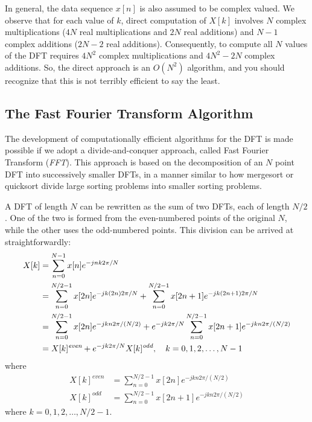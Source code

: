 In general, the data sequence $x[n]$ is also assumed to be complex
valued. We observe that for each value of $k$, direct computation of
$X[k]$ involves $N$ complex multiplications ($4N$ real multiplications
and $2N$ real additions) and $N-1$ complex additions ($2N-2$ real
additions). Consequently, to compute all $N$ values of the DFT
requires $4N^2$ complex multiplications and $4N^2-2N$ complex
additions. So, the direct approach is an $O(N^2)$ algorithm, and you
should recognize that this is not terribly efficient to say the
least.

\subsection{The Fast Fourier Transform Algorithm}
\label{sc:fft}

The development of computationally efficient algorithms for the DFT is
made possible if we adopt a divide-and-conquer approach, called Fast
Fourier Transform (\emph{FFT}).  This approach is based on the
decomposition of an $N$ point DFT into successively smaller DFTs, in a
manner similar to how mergesort or quicksort divide large sorting
problems into smaller sorting problems.

A DFT of length $N$ can be rewritten as the sum of two DFTs, each of
length $N/2$. One of the two is formed from the even-numbered points
of the original $N$, while the other uses the odd-numbered
points. This division can be arrived at straightforwardly:
\begin{align}
X[k] &= \sum_{n=0}^{N-1} x[n] e^{-jnk2\pi/N} \notag\\ 
&=
\sum_{n=0}^{N/2-1} x[2n] e^{-jk(2n)2\pi/N}+
\sum_{n=0}^{N/2-1} x[2n+1] e^{-jk(2n+1)2\pi/N}
\notag\\
&=
\sum_{n=0}^{N/2-1} x[2n] e^{-jkn2\pi/(N/2)}+
e^{-jk2\pi/N}\sum_{n=0}^{N/2-1} x[2n+1] e^{-jkn2\pi/(N/2)}
\notag\\
&= X[k]^{\textit{even}} + e^{-jk2\pi/N} X[k]^{\textit{odd}},
    \quad k=0,1,2,\ldots, N-1
\label{eq:fft-xexo}
\end{align}
where 
\begin{align}
X[k]^{\mathit{even}} &= \sum_{n=0}^{N/2-1} x[2n] e^{-jkn2\pi/(N/2)} \\
X[k]^{\mathit{odd}}  &= \sum_{n=0}^{N/2-1}x[2n+1] e^{-jkn2\pi/(N/2)}
\end{align}
where $k=0, 1, 2, \ldots, N/2-1$.

